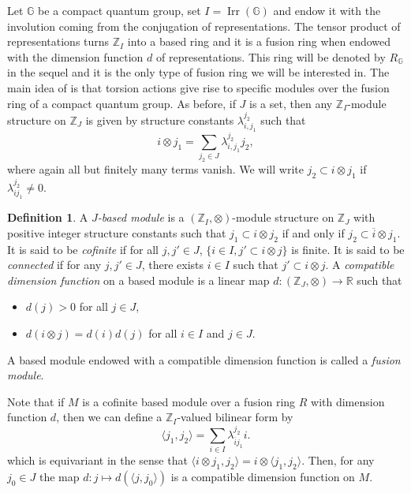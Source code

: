 \documentclass[a4paper, 11pt]{amsart}
\theoremstyle{plain}
\theoremstyle{definition}
\newtheorem{de}[thm]{Definition}
\theoremstyle{remark}
\DeclareMathOperator{\Irr}{Irr}
\newcommand{\G}{\mathbb{G}}
\newcommand{\R}{\mathbb{R}}
\newcommand{\Z}{\mathbb{Z}}
\begin{document}
Let $\G$ be a compact quantum group, set $I = \Irr(\G)$ and endow it with the involution coming from the conjugation of representations. The tensor product of representations turns $\Z_{I}$ into a based ring and it is a fusion ring when endowed with the dimension function $d$ of representations. This ring will be denoted by $R_{\G}$ in the sequel and it is the only type of fusion ring we will be interested in. The main idea of \cite{arano2015torsion} is that torsion actions give rise to specific modules over the fusion ring of a compact quantum group. As before, if $J$ is a set, then any $\Z_{I}$-module structure on $\Z_{J}$ is given by structure constants $\lambda_{i, j_{1}}^{j_{2}}$ such that
\begin{equation*}
i\otimes j_{1} = \sum_{j_{2}\in J}\lambda_{i, j_{1}}^{j_{2}}j_{2},
\end{equation*}
where again all but finitely many terms vanish. We will write $j_{2}\subset i\otimes j_{1}$ if $\lambda_{ij_{1}}^{j_{2}}\neq 0$.

\begin{de}%
A \emph{$J$-based module} is a $(\Z_{I}, \otimes)$-module structure on $\Z_{J}$ with positive integer structure constants such that $j_{1}\subset i\otimes j_{2}$ if and only if $j_{2}\subset \overline{i}\otimes j_{1}$. It is said to be \emph{cofinite} if for all $j, j'\in J$, $\{i\in I, j'\subset i\otimes j\}$ is finite. It is said to be \emph{connected} if for any $j, j'\in J$, there exists $i\in I$ such that $j'\subset i\otimes j$. A \emph{compatible dimension function} on a based module is a linear map $d : (\Z_{J}, \otimes) \rightarrow \R$ such that
\begin{itemize}
\item $d(j) > 0$ for all $j\in J$,
\item $d(i\otimes j) = d(i)d(j)$ for all $i\in I$ and $j\in J$.
\end{itemize}
A based module endowed with a compatible dimension function is called a \emph{fusion module}.
\end{de}

Note that if $M$ is a cofinite based module over a fusion ring $R$ with dimension function $d$, then we can define a $\Z_{I}$-valued bilinear form by
\begin{equation*}
\langle j_{1}, j_{2}\rangle = \sum_{i\in I}\lambda_{\overline{i}j_{1}}^{j_{2}}i.
\end{equation*}
which is equivariant in the sense that $\langle i\otimes j_{1}, j_{2}\rangle = i\otimes \langle j_{1}, j_{2}\rangle$. Then, for any $j_{0}\in J$ the map $d : j\mapsto d(\langle j, j_{0}\rangle)$ is a compatible dimension function on $M$.
\end{document}
